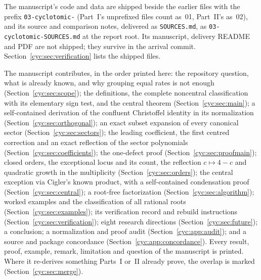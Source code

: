 \documentclass[11pt,a4paper]{article}
\numberwithin{equation}{section}
\theoremstyle{definition}
\theoremstyle{remark}
\begin{document}
The manuscript's code and data are shipped beside the earlier files with
the prefix \texttt{03-cyclotomic-} (Part~I's unprefixed files count as~01,
Part~II's as~02), and its source and comparison notes, delivered as
\nolinkurl{SOURCES.md}, as \nolinkurl{03-cyclotomic-SOURCES.md} at the
report root.  Its manuscript, delivery README and PDF are not shipped;
they survive in the arrival commit.  Section~\ref{cyc:sec:verification}
lists the shipped files.

The manuscript contributes, in the order printed here: the repository
question, what is already known, and why grouping equal rates is not
enough (Section~\ref{cyc:sec:scope}); the definitions, the complete
noncentral classification with its elementary sign test, and the central
theorem (Section~\ref{cyc:sec:main}); a self-contained derivation of the
confluent Christoffel identity in its normalization
(Section~\ref{cyc:sec:orthogonal}); an exact subset expansion of every
canonical sector (Section~\ref{cyc:sec:sectors}); the leading coefficient,
the first centred correction and an exact reflection of the sector
polynomials (Section~\ref{cyc:sec:coefficients}); the one-defect proof
(Section~\ref{cyc:sec:proofmain}); closed orders, the exceptional locus
and its count, the reflection $c\mapsto4-c$ and quadratic growth in the
multiplicity (Section~\ref{cyc:sec:orders}); the central exception via
Cigler's known product, with a self-contained condensation proof
(Section~\ref{cyc:sec:central}); a root-free factorization
(Section~\ref{cyc:sec:algorithm}); worked examples and the classification
of all rational roots (Section~\ref{cyc:sec:examples}); its verification
record and rebuild instructions (Section~\ref{cyc:sec:verification});
eight research directions (Section~\ref{cyc:sec:future}); a conclusion; a
normalization and proof audit (Section~\ref{cyc:app:audit}); and a source
and package concordance (Section~\ref{cyc:app:concordance}).  Every result,
proof, example, remark, limitation and question of the manuscript is
printed.  Where it re-derives something Parts~I or~II already prove, the
overlap is marked (Section~\ref{cyc:sec:merge}).
\end{document}
